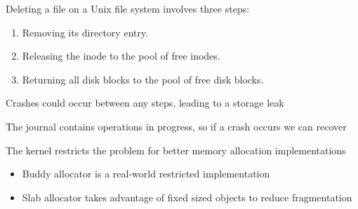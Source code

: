 \begin{slide}
  

  Deleting a file on a Unix file system involves three steps:

  \begin{enumerate}
    \item Removing its directory entry.
    \item Releasing the inode to the pool of free inodes.
    \item Returning all disk blocks to the pool of free disk blocks.
  \end{enumerate}
  \medskip

  Crashes could occur between any steps, leading to a storage leak
  \medskip

  The journal contains operations in progress, so if a crash occurs we can
  recover

\end{slide}

\begin{slide}


  The kernel restricts the problem for better memory allocation
  implementations

  \begin{itemize}
    \item Buddy allocator is a real-world restricted implementation
    \item Slab allocator takes advantage of fixed sized objects to reduce
          fragmentation
  \end{itemize}

\end{slide}



